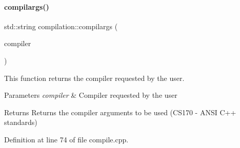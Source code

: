 \paragraph{\texorpdfstring{compilargs()}{compilargs()}}
{\footnotesize\ttfamily std\+::string compilation\+::compilargs (\begin{DoxyParamCaption}\item[{\mbox{\hyperlink{namespacecompilation_ab8b552e73f4f5a4912982468f052f089}{C\+O\+M\+P\+IL}}}]{compiler }\end{DoxyParamCaption})}



This function returns the compiler requested by the user. 


\begin{DoxyParams}{Parameters}
{\em compiler} & Compiler requested by the user\\
\hline
\end{DoxyParams}
\begin{DoxyReturn}{Returns}
Returns the compiler arguments to be used (C\+S170 -\/ A\+N\+SI C++ standards) 
\end{DoxyReturn}


Definition at line 74 of file compile.\+cpp.


